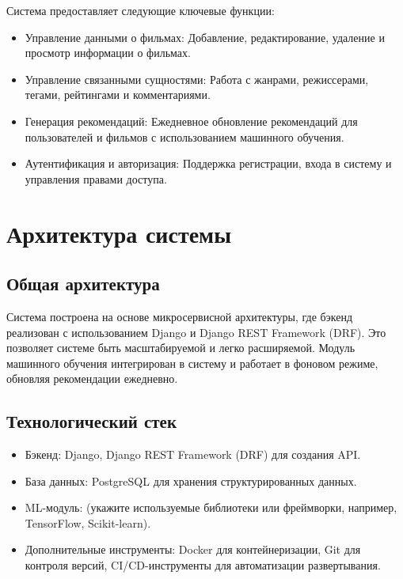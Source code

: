 Система предоставляет следующие ключевые функции: 
\begin{itemize}
    \item 
Управление
данными о фильмах: Добавление, редактирование, удаление и просмотр
информации о фильмах.
\item
Управление связанными сущностями:
Работа с жанрами, режиссерами, тегами, рейтингами и комментариями. 
\item
Генерация рекомендаций: Ежедневное обновление рекомендаций для
пользователей и фильмов с использованием машинного обучения. 
\item
Аутентификация и авторизация: Поддержка регистрации, входа в
систему и управления правами доступа.
\end{itemize}

\hypertarget{ux430ux440ux445ux438ux442ux435ux43aux442ux443ux440ux430-ux441ux438ux441ux442ux435ux43cux44b}{%
\section{Архитектура
системы}\label{ux430ux440ux445ux438ux442ux435ux43aux442ux443ux440ux430-ux441ux438ux441ux442ux435ux43cux44b}}

\hypertarget{ux43eux431ux449ux430ux44f-ux430ux440ux445ux438ux442ux435ux43aux442ux443ux440ux430}{%
\subsection*{Общая
архитектура}\label{ux43eux431ux449ux430ux44f-ux430ux440ux445ux438ux442ux435ux43aux442ux443ux440ux430}}

Система построена на основе микросервисной архитектуры, где бэкенд
реализован с использованием Django и Django REST
Framework (DRF). Это позволяет системе быть масштабируемой и легко
расширяемой. Модуль машинного обучения интегрирован в систему и работает
в фоновом режиме, обновляя рекомендации ежедневно.

\hypertarget{ux442ux435ux445ux43dux43eux43bux43eux433ux438ux447ux435ux441ux43aux438ux439-ux441ux442ux435ux43a}{%
\subsection*{Технологический
стек}\label{ux442ux435ux445ux43dux43eux43bux43eux433ux438ux447ux435ux441ux43aux438ux439-ux441ux442ux435ux43a}}

\begin{itemize}
\tightlist
\item
  Бэкенд: Django, Django REST Framework (DRF) для создания API.
\item
  База данных: PostgreSQL для хранения структурированных
  данных.
\item
  ML-модуль: (укажите используемые библиотеки или фреймворки,
  например, TensorFlow, Scikit-learn).
\item
  Дополнительные инструменты: Docker для контейнеризации, Git
  для контроля версий, CI/CD-инструменты для автоматизации
  развертывания.
\end{itemize}

